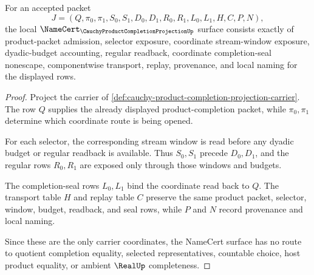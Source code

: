\begin{theorem}
\label{thm:cauchy-product-completion-projection-namecert-obligations}
For an accepted packet
$$
J=(Q,\pi_0,\pi_1,S_0,S_1,D_0,D_1,R_0,R_1,L_0,L_1,H,C,P,N),
$$
the local $\NameCert_{\CauchyProductCompletionProjectionUp}$ surface consists exactly of product-packet admission, selector exposure, coordinate stream-window exposure, dyadic-budget accounting, regular readback, coordinate completion-seal nonescape, componentwise transport, replay, provenance, and local naming for the displayed rows.
\end{theorem}
\begin{proof}
Project the carrier of \autoref{def:cauchy-product-completion-projection-carrier}. The row $Q$ supplies the already displayed product-completion packet, while $\pi_0,\pi_1$ determine which coordinate route is being opened.

For each selector, the corresponding stream window is read before any dyadic budget or regular readback is available. Thus $S_0,S_1$ precede $D_0,D_1$, and the regular rows $R_0,R_1$ are exposed only through those windows and budgets.

The completion-seal rows $L_0,L_1$ bind the coordinate read back to $Q$. The transport table $H$ and replay table $C$ preserve the same product packet, selector, window, budget, readback, and seal rows, while $P$ and $N$ record provenance and local naming.

Since these are the only carrier coordinates, the NameCert surface has no route to quotient completion equality, selected representatives, countable choice, host product equality, or ambient $\RealUp$ completeness.
\end{proof}

